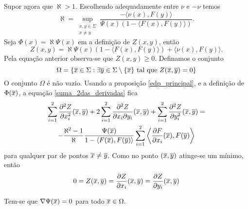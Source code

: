 Supor agora que $\aleph > 1$. Escolhendo adequadamente entre $\nu$ e $-\nu$ temos
\begin{equation*}
	\aleph = \sup_{\substack{x,y \in \Sigma\\ x \neq y}} \frac{- \langle \nu(x), F(y) \rangle}{\Psi(x)(1 - \langle F(x), F(y) \rangle)}.
\end{equation*}
Seja $\Phi(x) = \aleph \Psi(x)$ em a definição de $Z(x,y)$, então
\begin{equation*}
	Z(x,y) = \aleph \Psi(x)(1 - \langle F(x), F(y) \rangle) + \langle \nu(x), F(y) \rangle.
\end{equation*}
Pela equação anterior observa-se que $Z(x,y) \geq 0$.
Definamos o conjunto
\begin{equation*}
	\Omega = \{ \overline{x} \in \Sigma: \exists \overline{y} \in \Sigma \setminus \{\overline{x}\} \text{ tal que } Z(\overline{x},\overline{y}) = 0 \}
\end{equation*}
O conjunto $\Omega$ é não vazio.
Usando a proposição \eqref{edp_principal}, e a definição de $\Phi(\overline{x})$, a equação \eqref{suma_2das_derivadas} fica
\begin{multline}\label{suma_2da_der_aleph}
\sum_{i=1}^2 \frac{\partial^2 Z}{\partial x_i^2}(\overline{x},\overline{y}) + 2 \sum_{i=1}^2 \frac{\partial^2 Z}{\partial x_i \partial y_i}(\overline{x},\overline{y}) + \sum_{i=1}^2 \frac{\partial^2 Z}{\partial y_i^2}(\overline{x},\overline{y}) =\\
- \frac{\aleph^2 - 1}{\aleph} \frac{\Psi(\overline{x})}{1 - \langle F(\overline{x}), F(\overline{y}) \rangle} \sum_{i=1}^2 \left\langle \frac{\partial F}{\partial x_i}(\overline{x}), F(\overline{y}) \right\rangle
\end{multline}
para qualquer par de pontos $\overline{x} \neq \overline{y}$. Como no ponto $(\overline{x},\overline{y})$ atinge-se um mínimo, então
\begin{equation*}
	0 = Z(\overline{x},\overline{y}) = \frac{\partial Z}{\partial x_i}(\overline{x},\overline{y}) = \frac{\partial Z}{\partial y_i}(\overline{x},\overline{y})
\end{equation*}

\begin{proposicao}\label{gradiente_nulo}
	Tem-se que $\nabla \Psi(\overline{x}) = 0$ para todo $\overline{x} \in \Omega.$
\end{proposicao}


